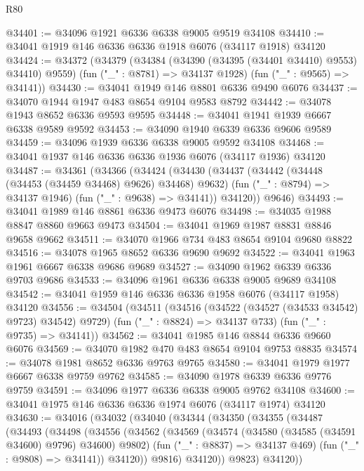 \begin{lexlean}{R80}
\begin{coremodule}
@34401 := @34096 @1921 @6336 @6338 @9005 @9519 @34108
@34410 := @34041 @1919 @146 @6336 @6336 @1918 @6076 (@34117 @1918) @34120
@34424 := @34372
    (@34379
      (@34384 (@34390 (@34395 (@34401 @34410) @9553) @34410) @9559)
      (fun ("_" : @8781) => @34137 @1928)
      (fun ("_" : @9565) => @34141))
@34430 := @34041 @1949 @146 @8801 @6336 @9490 @6076
@34437 := @34070 @1944 @1947 @483 @8654 @9104 @9583 @8792
@34442 := @34078 @1943 @8652 @6336 @9593 @9595
@34448 := @34041 @1941 @1939 @6667 @6338 @9589 @9592
@34453 := @34090 @1940 @6339 @6336 @9606 @9589
@34459 := @34096 @1939 @6336 @6338 @9005 @9592 @34108
@34468 := @34041 @1937 @146 @6336 @6336 @1936 @6076 (@34117 @1936) @34120
@34487 := @34361
    (@34366
      (@34424
        (@34430
          (@34437
            (@34442 (@34448 (@34453 (@34459 @34468) @9626) @34468) @9632)
            (fun ("_" : @8794) => @34137 @1946)
            (fun ("_" : @9638) => @34141))
          @34120))
      @9646)
@34493 := @34041 @1989 @146 @8861 @6336 @9473 @6076
@34498 := @34035 @1988 @8847 @8860 @9663 @9473
@34504 := @34041 @1969 @1987 @8831 @8846 @9658 @9662
@34511 := @34070 @1966 @734 @483 @8654 @9104 @9680 @8822
@34516 := @34078 @1965 @8652 @6336 @9690 @9692
@34522 := @34041 @1963 @1961 @6667 @6338 @9686 @9689
@34527 := @34090 @1962 @6339 @6336 @9703 @9686
@34533 := @34096 @1961 @6336 @6338 @9005 @9689 @34108
@34542 := @34041 @1959 @146 @6336 @6336 @1958 @6076 (@34117 @1958) @34120
@34556 := @34504
    (@34511
      (@34516 (@34522 (@34527 (@34533 @34542) @9723) @34542) @9729)
      (fun ("_" : @8824) => @34137 @733)
      (fun ("_" : @9735) => @34141))
@34562 := @34041 @1985 @146 @8844 @6336 @9660 @6076
@34569 := @34070 @1982 @470 @483 @8654 @9104 @9753 @8835
@34574 := @34078 @1981 @8652 @6336 @9763 @9765
@34580 := @34041 @1979 @1977 @6667 @6338 @9759 @9762
@34585 := @34090 @1978 @6339 @6336 @9776 @9759
@34591 := @34096 @1977 @6336 @6338 @9005 @9762 @34108
@34600 := @34041 @1975 @146 @6336 @6336 @1974 @6076 (@34117 @1974) @34120
@34630 := @34016
    (@34032
      (@34040
        (@34344
          (@34350
            (@34355
              (@34487
                (@34493
                  (@34498
                    (@34556
                      (@34562
                        (@34569
                          (@34574 (@34580 (@34585 (@34591 @34600) @9796) @34600) @9802)
                          (fun ("_" : @8837) => @34137 @469)
                          (fun ("_" : @9808) => @34141))
                        @34120))
                    @9816)
                  @34120))
              @9823)
            @34120))

\end{coremodule}
\end{lexlean}
